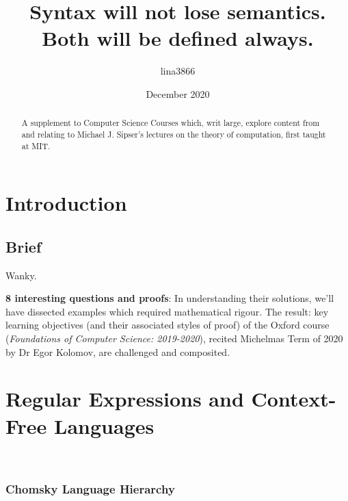 \documentclass{article}
\title{Syntax will not lose semantics. Both will be defined always.}
\author{lina3866 }
\date{December 2020}
\theoremstyle{mydef}
\theoremstyle{mythm}
\theoremstyle{mylemming}
\theoremstyle{myq}
\begin{document}
\maketitle

\begin{abstract}

A supplement to Computer Science Courses which, writ large, explore content from and relating to Michael J. Sipser's lectures on the theory of computation, first taught at MIT.

\end{abstract}

\section{Introduction}

\subsection{Brief}

Wanky. %

\textbf{8 interesting questions and proofs}: In understanding their solutions, we'll have dissected examples which required mathematical rigour. The result: key learning objectives (and their associated styles of proof) of the Oxford course (\emph{Foundations of Computer Science:  2019-2020}),  recited Michelmas Term of 2020 by Dr Egor Kolomov, are challenged and composited. 
\newpage

\section{Regular Expressions and Context-Free Languages}
\\
\subsubsection{Chomsky Language Hierarchy}
\end{document}
